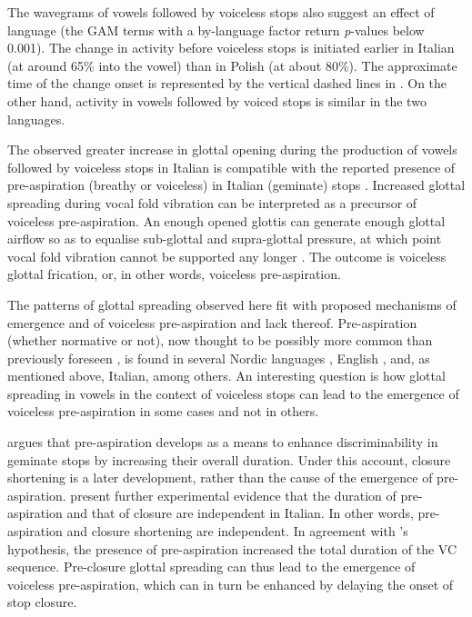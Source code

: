 \documentclass[
  11pt,
  a4paper,
]{article}
\begin{document}
The wavegrams of vowels followed by voiceless stops also suggest an
effect of language (the GAM terms with a by-language factor return
\emph{p}-values below 0.001). The change in activity before voiceless
stops is initiated earlier in Italian (at around 65\% into the vowel)
than in Polish (at about 80\%). The approximate time of the change onset
is represented by the vertical dashed lines in . On the
other hand, activity in vowels followed by voiced stops is similar in
the two languages.

The observed greater increase in glottal opening during the production
of vowels followed by voiceless stops in Italian is compatible with the
reported presence of pre-aspiration (breathy or voiceless) in Italian
(geminate) stops
\citep{ni-chasaide1993, stevens2004, stevens2004a, stevens2010, stevens2010b, stevens2014a}.
Increased glottal spreading during vocal fold vibration can be
interpreted as a precursor of voiceless pre-aspiration. An enough opened
glottis can generate enough glottal airflow so as to equalise
sub-glottal and supra-glottal pressure, at which point vocal fold
vibration cannot be supported any longer
\citep{berg1958, rothenberg1967, ohala2011}. The outcome is voiceless
glottal frication, or, in other words, voiceless pre-aspiration.

The patterns of glottal spreading observed here fit with proposed
mechanisms of emergence and of voiceless pre-aspiration and lack
thereof. Pre-aspiration (whether normative or not), now thought to be
possibly more common than previously foreseen \citep{helgason2002}, is
found in several Nordic languages \citet{helgason1999, helgason2002},
English \citep{gordeeva2007, nance2013, hejna2015a}, and, as mentioned
above, Italian, among others. An interesting question is how glottal
spreading in vowels in the context of voiceless stops can lead to the
emergence of voiceless pre-aspiration in some cases and not in others.

\citep{nichasaide1985} argues that pre-aspiration develops as a means to
enhance discriminability in geminate stops by increasing their overall
duration. Under this account, closure shortening is a later development,
rather than the cause of the emergence of pre-aspiration.
\citet{stevens2014} present further experimental evidence that the
duration of pre-aspiration and that of closure are independent in
Italian. In other words, pre-aspiration and closure shortening are
independent. In agreement with \citeauthor{nichasaide1985}'s hypothesis,
the presence of pre-aspiration increased the total duration of the VC
sequence. Pre-closure glottal spreading can thus lead to the emergence
of voiceless pre-aspiration, which can in turn be enhanced by delaying
the onset of stop closure.
\end{document}

